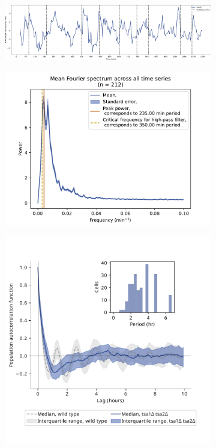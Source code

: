 \begin{figure}
  \centering
  \begin{subfigure}[t]{1.0\textwidth}
   \centering
   \includegraphics[width=\textwidth]{1649_tsa1tsa2morgan_018-14-1_edit.pdf}
   \caption{
   }
   \label{fig:biology-tsa1tsa2-single}
  \end{subfigure}

  \begin{subfigure}[t]{0.45\textwidth}
   \centering
   \includegraphics[width=\textwidth]{tsa1tsa2morgan_1649_13.pdf}
   \caption{
   }
   \label{fig:biology-tsa1tsa2-fourier}
  \end{subfigure}%
  \begin{subfigure}[t]{0.45\textwidth}
   \centering
   \includegraphics[width=\textwidth]{tsa1tsa2morgan_1649_12.pdf}

\end{subfigure}
\end{figure}
